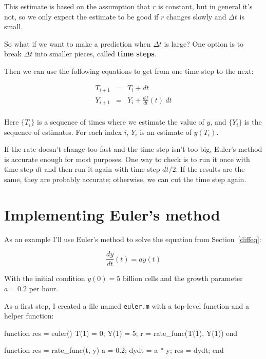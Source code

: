\documentclass[
]{book}
\numberwithin{Answer}{chapter}
\numberwithin{Exercise}{chapter}
\begin{document}
This estimate is based on the assumption that $r$ is constant, but
in general it's not, so we only expect the estimate to be good if
$r$ changes slowly and $\Delta t$ is small.

So what if we want to make a prediction when $\Delta t$ is large?
One option is to break $\Delta t$ into smaller pieces, called
{\bf time steps}.

Then we can use the following equations to get from one time step to the next:

\begin{eqnarray}
\label{eq:euler2}
T_{i+1} &=& T_i + dt                       \\
Y_{i+1} &=& Y_i + \frac{df}{dt}(t)~dt           \\
\end{eqnarray}

Here $\{T_i\}$ is a sequence of times where we estimate the value
of $y$, and $\{Y_i\}$ is the sequence of estimates.  For each
index $i$, $Y_i$ is an estimate of $y(T_i)$.


If the rate doesn't change too fast and the time step isn't
too big, Euler's method is accurate enough for most purposes.  One
way to check is to run it once with time step $dt$ and then run it
again with time step $dt/2$.  If the results are the same, they are
probably accurate; otherwise, we can cut the time step again.


\section{Implementing Euler's method}

As an example I'll use Euler's method to solve the equation from Section~\ref{diffeq}:

\[ \frac{dy}{dt}(t) = a y(t) \]

With the initial condition $y(0) = 5$ billion cells and
the growth parameter $a = 0.2$ per hour. 


As a first step, I created a file named {\tt euler.m} with a top-level function and a helper function:

\begin{code}
function res = euler()
    T(1) = 0;
    Y(1) = 5;
    r = rate_func(T(1), Y(1))
end

function res = rate_func(t, y)
   a = 0.2;
   dydt = a * y;
   res = dydt;
end
\end{code}
\end{document}
